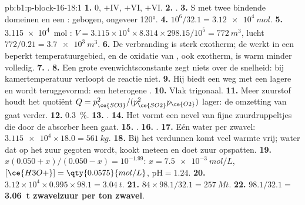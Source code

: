 \begin{solution}{pb:b1:p-block-16-18:1}
\textbf{1.} 0, $+$IV, $+$VI, $+$VI.
\textbf{2.} .
\textbf{3.} S met twee bindende domeinen en een : gebogen,
ongeveer \ang{120}.
\textbf{4.} $10^6/32.1 = \qty{3.12e4}{mol}$.
\textbf{5.} \qty{3.115e4}{mol} : $V = 3.115 \times 10^4 \times
8.314 \times 298.15/10^5 = \qty{772}{m^3}$, lucht $772/0.21 = \qty{3.7e3}{m^3}$.
\textbf{6.} De verbranding is sterk exotherm; de  werkt in een
beperkt temperatuurgebied, en de oxidatie van , ook exotherm, is
warm minder volledig.
\textbf{7.} .
\textbf{8.} Een grote evenwichtsconstante zegt niets over de snelheid: bij
kamertemperatuur verloopt de reactie niet.
\textbf{9.} Hij biedt een weg met een lagere  en wordt
teruggevormd: een heterogene .
\textbf{10.} Vlak trigonaal.
\textbf{11.} Meer zuurstof houdt het quotiënt
$Q = p_{\ce{SO3}}^2/(p_{\ce{SO2}}^2 p_{\ce{O2}})$ lager: de omzetting
van  gaat verder.
\textbf{12.} \qty{0.3}{\percent}.
\textbf{13.} .
\textbf{14.} Het vormt een nevel van fijne zuurdruppeltjes die door de
absorber heen gaat.
\textbf{15.} .
\textbf{16.} .
\textbf{17.} Eén water per zwavel: $\num{3.115e4} \times 18.0 =
\qty{561}{kg}$.
\textbf{18.} Bij het verdunnen komt veel warmte vrij; water dat op het
zuur gegoten wordt, kookt meteen en doet zuur opspatten.
\textbf{19.} $x(0.050 + x)/(0.050 - x) = 10^{-1.99}$: $x = \qty{7.5e-3}{mol/L}$,
$[\ce{H3O+}] = \qty{0.0575}{mol/L}$, $\mathrm{pH} = 1.24$.
\textbf{20.} $3.12 \times 10^4 \times 0.995 \times 98.1 = \qty{3.04}{t}$.
\textbf{21.} $84 \times 98.1/32.1 = \qty{257}{Mt}$.
\textbf{22.} $98.1/32.1 =$ \textbf{\qty{3.06}{t} zwavelzuur per ton
zwavel}.
\end{solution}
